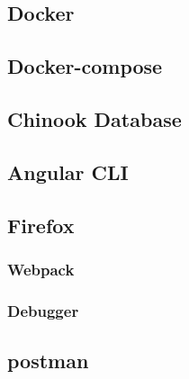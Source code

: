 \subsection{Docker}
\subsection{Docker-compose}
\subsection{Chinook Database}
\subsection{Angular CLI}
\subsection{Firefox}
\subsubsection{Webpack}
\subsubsection{Debugger}
\subsection{postman}
